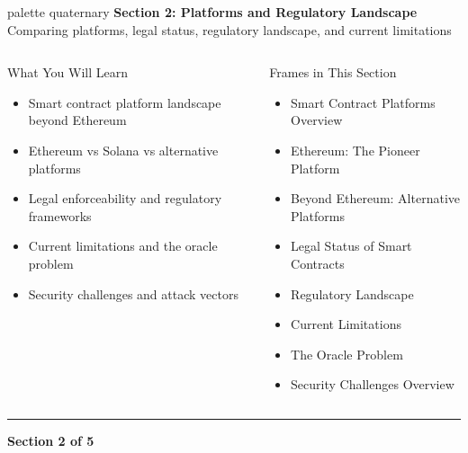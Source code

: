 \documentclass[8pt,aspectratio=169]{beamer}
\newcommand{\bottomnote}[1]{\vfill\vspace{-2mm}\textcolor{mllavender2}{\rule{\textwidth}{0.4pt}}\vspace{1mm}\footnotesize\textbf{#1}}
\begin{document}
\begin{frame}{}
\begin{beamercolorbox}[sep=12pt,center,rounded=true,shadow=true]{palette quaternary}
  {\Large\bfseries Section 2: Platforms and Regulatory Landscape}\\[6pt]
  {\normalsize Comparing platforms, legal status, regulatory landscape, and current limitations}
\end{beamercolorbox}
\vspace{4mm}
\begin{columns}[T]
\begin{block}{What You Will Learn}
\footnotesize
\begin{itemize}
  \item Smart contract platform landscape beyond Ethereum
  \item Ethereum vs Solana vs alternative platforms
  \item Legal enforceability and regulatory frameworks
  \item Current limitations and the oracle problem
  \item Security challenges and attack vectors
\end{itemize}
\end{block}
\begin{block}{Frames in This Section}
\footnotesize
\begin{itemize}
  \item Smart Contract Platforms Overview
  \item Ethereum: The Pioneer Platform
  \item Beyond Ethereum: Alternative Platforms
  \item Legal Status of Smart Contracts
  \item Regulatory Landscape
  \item Current Limitations
  \item The Oracle Problem
  \item Security Challenges Overview
\end{itemize}
\end{block}
\end{columns}
\bottomnote{Section 2 of 5}
\end{frame}
\end{document}
